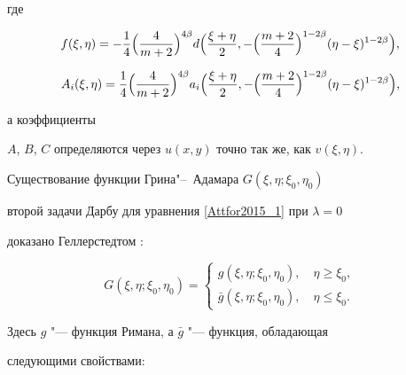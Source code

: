 где

$$

f(\xi,\eta)=-\frac{1}{4} \Bigl(\frac{4}{m+2}\Bigr)^{4\beta} d

\Bigl(\frac{\xi+\eta}{2},-\Bigl(\frac{m+2}{4}\Bigr)^{1-2\beta}

(\eta-\xi)^{1-2\beta} \Bigr),

$$

$$

A_i(\xi,\eta)=\frac{1}{4} \Bigl(\frac{4}{m+2}\Bigr)^{4\beta} a_i

\Bigl(\frac{\xi+\eta}{2},-\Bigl(\frac{m+2}{4}\Bigr)^{1-2\beta}

(\eta-\xi)^{1-2\beta} \Bigr),

$$

а коэффициенты

$A$, $B$, $C$ определяются через $u(x,y)$ точно так же, как $v(\xi,\eta)$.



Существование функции Грина"--~Адамара $G(\xi,\eta;\xi_0,\eta_0)$ 

второй задачи Дарбу для уравнения \eqref{Attfor2015_1} при $\lambda=0$

доказано Геллерстедтом \cite{Attfor2015_lit_02}:


\begin{displaymath}

G(\xi,\eta;\xi_0,\eta_0) = 

\left\{ \begin{array}{ll}

     g (\xi,\eta;\xi_0,\eta_0), \quad \eta\geqslant\xi_0,\\

\bar{g}(\xi,\eta;\xi_0,\eta_0), \quad \eta\leqslant\xi_0.

\end{array} \right.

\end{displaymath}

Здесь $g$ "--- функция Римана, а $\bar{g}$ "--- функция, обладающая 

следующими свойствами:

